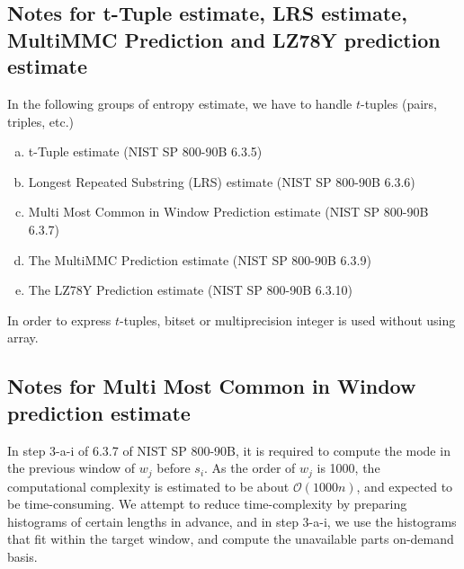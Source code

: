 ﻿\documentclass[a4paper,xelatex,english]{bxjsarticle}
\begin{document}
\subsection{Notes for t-Tuple estimate, LRS estimate, MultiMMC Prediction and LZ78Y prediction estimate}
In the following groups of entropy estimate, we have to handle $t$-tuples (pairs, triples, etc.)
\begin{enumerate}[a)]
	\item t-Tuple estimate (NIST SP 800-90B 6.3.5)
	\item Longest Repeated Substring (LRS) estimate (NIST SP 800-90B 6.3.6)
	\item Multi Most Common in Window Prediction estimate (NIST SP 800-90B 6.3.7)
	\item The MultiMMC Prediction estimate (NIST SP 800-90B 6.3.9)
	\item The LZ78Y Prediction estimate (NIST SP 800-90B 6.3.10)
\end{enumerate}
In order to express $t$-tuples, bitset or multiprecision integer is used without using array.

\subsection{Notes for Multi Most Common in Window prediction estimate}
In step 3-a-i of 6.3.7 of NIST SP 800-90B, it is required to compute the mode in the previous window of $w_{j}$ before $s_{i}$. 
As the order of $w_{j}$ is 1000, the computational complexity is estimated to be about $\mathcal{O}(1000n)$, and expected to be time-consuming. 
We attempt to reduce time-complexity by preparing histograms of certain lengths in advance, and in step 3-a-i, we use the histograms that fit within the target window, and compute the unavailable parts on-demand basis.
\end{document}
